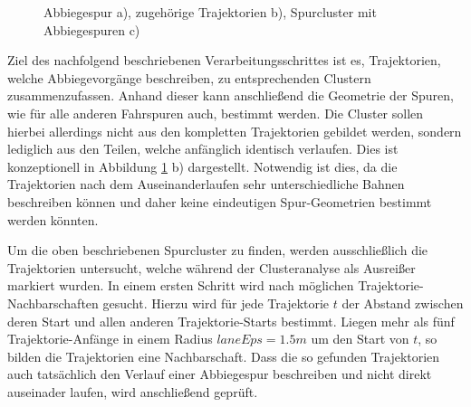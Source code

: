 \begin{figure}[H]
    \centering
    \qquad \qquad \qquad
    \caption[Abbiegespur Neckartor Kreuzung]{Abbiegespur a), zugehörige Trajektorien b), Spurcluster mit Abbiegespuren c)}
    \label{fig:real_turning_lane}
\end{figure}

Ziel des nachfolgend beschriebenen Verarbeitungsschrittes ist es, Trajektorien, welche Abbiegevorgänge
beschreiben, zu entsprechenden Clustern zusammenzufassen. Anhand dieser kann anschließend die Geometrie
der Spuren, wie für alle anderen Fahrspuren auch, bestimmt werden.
Die Cluster sollen hierbei allerdings nicht aus den kompletten Trajektorien gebildet werden, sondern
lediglich aus den Teilen, welche anfänglich identisch verlaufen. Dies ist konzeptionell in Abbildung
\ref{fig:real_turning_lane} b) dargestellt. Notwendig ist dies, da die Trajektorien nach dem Auseinanderlaufen
sehr unterschiedliche Bahnen beschreiben können und daher keine eindeutigen Spur-Geometrien bestimmt werden könnten.

Um die oben beschriebenen Spurcluster zu finden, werden ausschließlich die Trajektorien untersucht,
welche während der Clusteranalyse als Ausreißer markiert wurden.
In einem ersten Schritt wird nach möglichen Trajektorie-Nachbarschaften gesucht. Hierzu wird für
jede Trajektorie $t$ der Abstand zwischen deren Start und allen anderen Trajektorie-Starts bestimmt.
Liegen mehr als fünf Trajektorie-Anfänge in einem Radius $laneEps = 1.5m$ um den Start von $t$, so bilden
die Trajektorien eine Nachbarschaft.
Dass die so gefunden Trajektorien auch tatsächlich den Verlauf einer Abbiegespur beschreiben und nicht
direkt auseinader laufen, wird anschließend geprüft.

